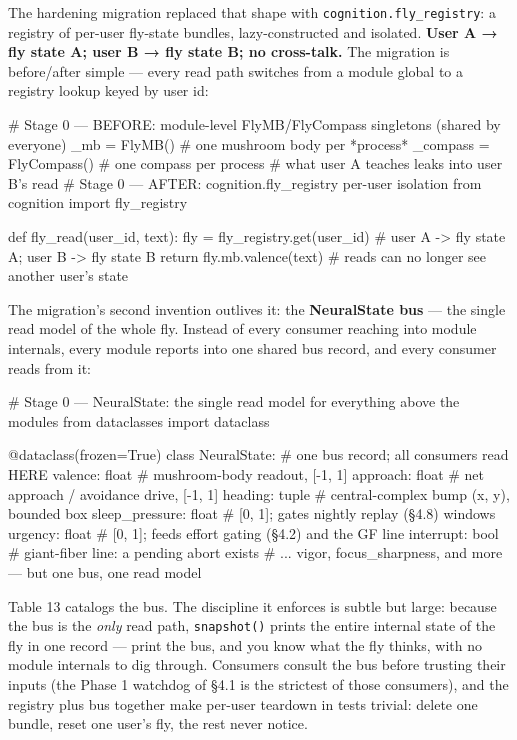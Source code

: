 \documentclass[11pt]{article}
\begin{document}
The hardening migration replaced that shape with \texttt{cognition.fly\_registry}: a registry of per-user fly-state bundles, lazy-constructed and isolated. \textbf{User A → fly state A; user B → fly state B; no cross-talk.} The migration is before/after simple — every read path switches from a module global to a registry lookup keyed by user id:

\begin{CodeBlock}
# Stage 0 — BEFORE: module-level FlyMB/FlyCompass singletons (shared by everyone)
_mb = FlyMB()                       # one mushroom body per *process*
_compass = FlyCompass()             # one compass per process
                                    # what user A teaches leaks into user B's read
# Stage 0 — AFTER: cognition.fly_registry per-user isolation
from cognition import fly_registry

def fly_read(user_id, text):
    fly = fly_registry.get(user_id) # user A -> fly state A; user B -> fly state B
    return fly.mb.valence(text)     # reads can no longer see another user's state
\end{CodeBlock}

The migration's second invention outlives it: the \textbf{NeuralState bus} — the single read model of the whole fly. Instead of every consumer reaching into module internals, every module reports into one shared bus record, and every consumer reads from it:

\begin{CodeBlock}
# Stage 0 — NeuralState: the single read model for everything above the modules
from dataclasses import dataclass

@dataclass(frozen=True)
class NeuralState:                 # one bus record; all consumers read HERE
    valence: float                 # mushroom-body readout, [-1, 1]
    approach: float                # net approach / avoidance drive, [-1, 1]
    heading: tuple                 # central-complex bump (x, y), bounded box
    sleep_pressure: float          # [0, 1]; gates nightly replay (§4.8) windows
    urgency: float                 # [0, 1]; feeds effort gating (§4.2) and the GF line
    interrupt: bool                # giant-fiber line: a pending abort exists
    # ... vigor, focus_sharpness, and more — but one bus, one read model
\end{CodeBlock}

Table 13 catalogs the bus. The discipline it enforces is subtle but large: because the bus is the \emph{only} read path, \texttt{snapshot()} prints the entire internal state of the fly in one record — print the bus, and you know what the fly thinks, with no module internals to dig through. Consumers consult the bus before trusting their inputs (the Phase 1 watchdog of §4.1 is the strictest of those consumers), and the registry plus bus together make per-user teardown in tests trivial: delete one bundle, reset one user's fly, the rest never notice.
\end{document}
